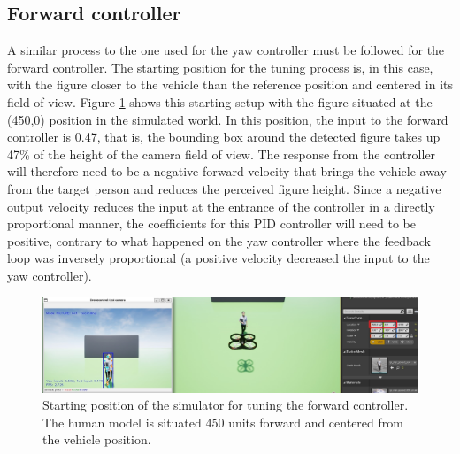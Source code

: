 \subsection{Forward controller}

A similar process to the one used for the yaw controller must be followed for the forward controller.
The starting position for the tuning process is, in this case, with the figure closer to the vehicle than the reference position and centered in its field of view.
Figure \ref{fig:tune-ref-pos-fwd} shows this starting setup with the figure situated at the (450,0) position in the simulated world.
In this position, the input to the forward controller is 0.47, that is, the bounding box around the detected figure takes up 47\% of the height of the camera field of view.
The response from the controller will therefore need to be a negative forward velocity that brings the vehicle away from the target person and reduces the perceived figure height.
Since a negative output velocity reduces the input at the entrance of the controller in a directly proportional manner, the coefficients for this PID controller will need to be positive, contrary to what happened on the yaw controller where the feedback loop was inversely proportional (a positive velocity decreased the input to the yaw controller).



\begin{figure}
  \centering
  \includegraphics[width=\textwidth, keepaspectratio]{img/pid/tune-ref-pos-fwd.jpg}
  \caption{Starting position of the simulator for tuning the forward controller. The human model is situated 450 units forward and centered from the vehicle position.}\label{fig:tune-ref-pos-fwd}
\end{figure}

